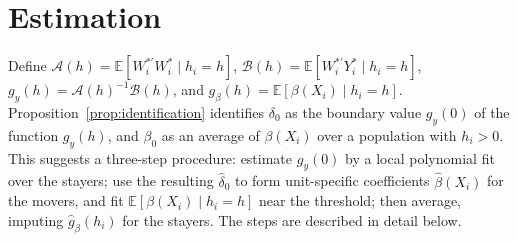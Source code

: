 \documentclass{article}
\newcommand{\normm}[1]{\lVert#1\rVert}
\newcommand{\E}{\mathbb{E}}
\newcommand{\I}{\mathbbm{1}}
\begin{document}







\section{Estimation}\label{sec:estimation}
Define $\mathcal{A}(h)=\E[W_i^{*\prime}W_i^{*}\mid h_i=h]$, $\mathcal{B}(h)=\E[W_i^{*\prime}Y_i^{*}\mid h_i=h]$, $g_y(h)=\mathcal{A}(h)^{-1}\mathcal{B}(h)$, and $g_{\beta}(h) = \E[\beta(X_i)\mid h_i=h]$.
Proposition~\ref{prop:identification} identifies $\delta_0$ as the boundary value $g_y(0)$ of the
function $g_y(h)$, and $\beta_0$ as an average of $\beta(X_i)$ over a population with $h_i>0$.
This suggests a three-step procedure: estimate $g_y(0)$ by a local polynomial fit over the
stayers; use the resulting $\hat{\delta}_0$ to form unit-specific coefficients $\hat{\beta}(X_i)$
for the movers, and fit $\E[\beta(X_i)\mid h_i=h]$ near the threshold; then average,
imputing $\hat{g}_\beta(h_i)$ for the stayers. The steps are described in detail below.
\end{document}
